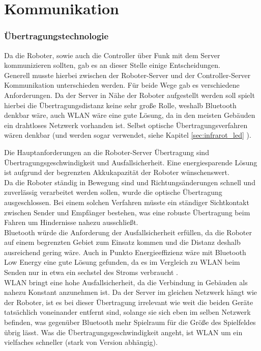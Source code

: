 \chapter{Kommunikation}
\label{sec:kommunikation}

\subsection{Übertragungstechnologie}
Da die Roboter, sowie auch die Controller über Funk mit dem Server kommunizieren sollten, gab es an dieser Stelle einige Entscheidungen. \\
Generell musste hierbei zwischen der Roboter-Server und der Controller-Server Kommunikation unterschieden werden. Für beide Wege gab es verschiedene Anforderungen. 
Da der Server in Nähe der Roboter aufgestellt werden soll spielt hierbei die Übertragungsdistanz keine sehr große Rolle, weshalb Bluetooth denkbar wäre, auch WLAN wäre eine gute Lösung, da in den meisten Gebäuden ein drahtloses Netzwerk vorhanden ist. Selbst optische Übertragungsverfahren wären denkbar (und werden sogar verwendet, siehe Kapitel \ref{sec:infrarot_led}
).

Die Hauptanforderungen an die Roboter-Server Übertragung sind Übertragungsgeschwindigkeit und Ausfallsicherheit. Eine energiesparende Lösung ist aufgrund der begrenzten Akkukapazität der Roboter wünschenswert. \\
Da die Roboter ständig in Bewegung sind und Richtungsänderungen schnell und zuverlässig verarbeitet werden sollen, wurde die optische Übertragung ausgeschlossen. Bei einem solchen Verfahren müsste ein ständiger Sichtkontakt zwischen Sender und Empfänger bestehen, was eine robuste Übertragung beim Fahren um Hindernisse nahezu ausschließt. \\
 Bluetooth würde die Anforderung der Ausfallsicherheit erfüllen, da die Roboter auf einem begrenzten Gebiet zum Einsatz kommen und die Distanz deshalb ausreichend gering wäre. Auch in Punkto Energieeffizienz wäre mit Bluetooth Low Energy eine gute Lösung gefunden, da es im Vergleich zu WLAN beim Senden nur in etwa ein sechstel des Stroms verbraucht %
. \\
WLAN bringt eine hohe Ausfallsicherheit, da die Verbindung in Gebäuden als nahezu Konstant anzunehmen ist. Da der Server im gleichen Netzwerk hängt wie der Roboter, ist es bei dieser Übertragung irrelevant wie weit die beiden Geräte tatsächlich voneinander entfernt sind, solange sie sich eben im selben Netzwerk befinden, was gegenüber Bluetooth mehr Spielraum für die Größe des Spielfeldes übrig lässt. Was die Übertragungsgeschwindigkeit angeht, ist WLAN um ein vielfaches schneller (stark von Version abhängig). \\

